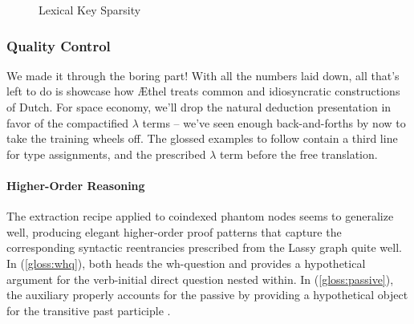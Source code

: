 \begin{figure}
	\centering
	\caption{Lexical Key Sparsity}
	\label{figure:entry_sparsity}
\end{figure}

\pagebreak

\subsubsection{Quality Control}
We made it through the boring part!
With all the numbers laid down, all that's left to do is showcase how \AE thel treats common and idiosyncratic constructions of Dutch.
For space economy, we'll drop the natural deduction presentation in favor of the compactified $\lambda$ terms -- we've seen enough back-and-forths by now to take the training wheels off.
The glossed examples to follow contain a third line for type assignments, and the prescribed $\lambda$ term before the free translation.

\paragraph{Higher-Order Reasoning}
The extraction recipe applied to coindexed phantom nodes seems to generalize well, producing elegant higher-order proof patterns that capture the corresponding syntactic reentrancies prescribed from the Lassy graph quite well.
In (\ref{gloss:whq}),  both heads the wh-question and provides a hypothetical argument for the verb-initial direct question nested within.
In (\ref{gloss:passive}), the auxiliary  properly accounts for the passive by providing a hypothetical object for the transitive past participle .

